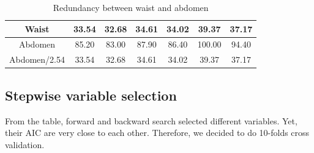 \documentclass[letterpaper,9pt,twocolumn,twoside,]{pinp}
\begin{document}
\begin{table}[h]

\begin{tabular}{|c|c|c|c|c|c|c|}
\hline
Waist & 33.54 & 32.68 & 34.61 & 34.02 & 39.37 & 37.17\\
\hline
Abdomen  & 85.20  & 83.00 & 87.90 & 86.40 & 100.00& 94.40\\
\hline
Abdomen/2.54  & 33.54 & 32.68 & 34.61 & 34.02 & 39.37 & 37.17\\
\hline

\end{tabular}
\caption{Redundancy between waist and abdomen}
\label{table:label_here}
\end{table}

\hypertarget{stepwise-variable-selection}{%
\subsection{Stepwise variable
selection}\label{stepwise-variable-selection}}

From the table, forward and backward search selected different
variables. Yet, their AIC are very close to each other. Therefore, we
decided to do 10-folds cross validation.
\end{document}
